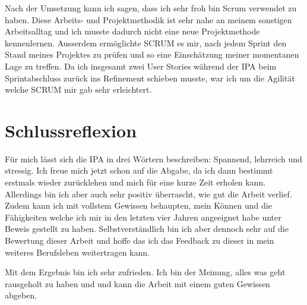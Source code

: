 Nach der Umsetzung kann ich sagen, dass ich sehr froh bin Scrum verwendet zu haben. Diese Arbeits- und Projektmethodik
ist sehr nahe an meinem sonstigen Arbeitsalltag und ich musste dadurch nicht eine neue Projektmethode kennenlernen. Ausserdem ermöglichte SCRUM es mir,
nach jedem Sprint den Stand meines Projektes zu prüfen und so eine Einschätzung meiner momentanen Lage zu treffen. Da ich insgesamt zwei User Stories während der IPA beim 
Sprintabschluss zurück ins Refinement schieben musste, war ich um die Agilität welche SCRUM mir gab sehr erleichtert. 

\section{Schlussreflexion}
Für mich lässt sich die IPA in drei Wörtern beschreiben: Spannend, lehrreich und stressig. 
Ich freue mich jetzt schon auf die Abgabe, da ich dann bestimmt erstmals wieder zurücklehen und mich für eine
kurze Zeit erholen kann. Allerdings bin ich aber auch sehr positiv überrascht, wie gut die Arbeit verlief. Zudem kann ich mit vollstem
Gewissen behaupten, mein Können und die Fähigkeiten welche ich mir in den letzten vier Jahren angeeignet habe unter Beweis gestellt zu haben. 
Selbstverständlich bin ich aber dennoch sehr auf die Bewertung dieser Arbeit und hoffe das ich das Feedback zu dieser in mein weiteres Berufsleben weitertragen
kann.

Mit dem Ergebnis bin ich sehr zufrieden. Ich bin der Meinung, alles was geht rausgeholt zu haben und
und kann die Arbeit mit einem guten Gewissen abgeben.